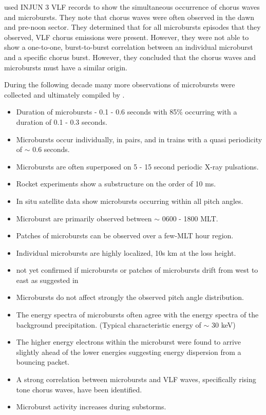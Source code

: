 \documentclass[referee,a4paper,12pt,traditabstract]{swsc}
\begin{document}
\begin{linenumbers}
\citet{Oliven1968} used INJUN 3 VLF records to show the simultaneous occurrence of chorus waves and microbursts. They note that chorus waves were often observed in the dawn and pre-noon sector\citep{Oliven1968}. They determined that for all microbursts episodes that they observed, VLF chorus emissions were present. However, they were not able to show a one-to-one, burst-to-burst correlation between an individual microburst and a specific chorus burst. However, they concluded that the chorus waves and microbursts must have a similar origin.


During the following decade many more observations of microbursts were collected and ultimately compiled by \citet[][and references therein]{Parks1978}.  
\begin{itemize}
\item Duration of microbursts - 0.1 - 0.6 seconds with 85\% occurring with a duration of 0.1 - 0.3 seconds.
\item Microbursts occur individually, in pairs, and in trains with a quasi periodicity of $\sim$ 0.6 seconds.
\item Microbursts are often superposed on 5 - 15 second periodic X-ray pulsations.
\item Rocket experiments show a substructure on the order of 10 ms.
\item In situ satellite data show microbursts occurring within all pitch angles. 
\item Microburst are primarily observed between $\sim$ 0600 - 1800 MLT.
\item Patches of microbursts can be observed over a few-MLT hour region. 
\item Individual microbursts are highly localized, 10s km at the loss height. 
\item not yet confirmed if microbursts or patches of microbursts drift from west to east as suggested in \citet{Parks1967}
\item Microbursts do not affect strongly the observed pitch angle distribution.  
\item The energy spectra of microbursts often agree with the energy spectra of the background precipitation. (Typical characteristic energy of $\sim$ 30 keV)
\item The higher energy electrons within the microburst were found to arrive slightly ahead of the lower energies suggesting energy dispersion from a bouncing packet. 
\item A strong correlation between microbursts and VLF waves, specifically rising tone chorus waves, have been identified. 
\item Microburst activity increases during substorms. 
\end{itemize}


\end{linenumbers}
\end{document}
